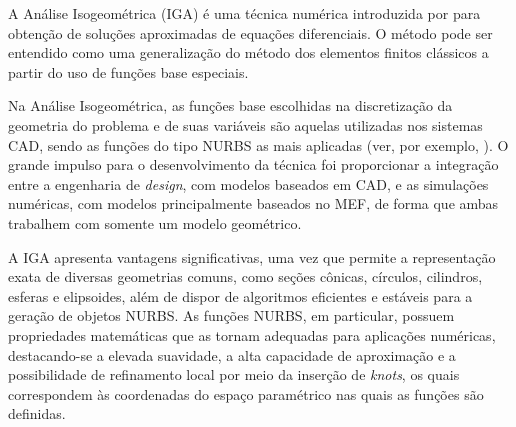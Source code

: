 \documentclass[tese_patricia]{subfiles}
\begin{document}


A Análise Isogeométrica (IGA) é uma técnica numérica introduzida por  para obtenção de soluções aproximadas de equações diferenciais. O método pode ser entendido como uma generalização do método dos elementos finitos clássicos a partir do uso de funções base especiais. 

Na Análise Isogeométrica, as funções base escolhidas na discretização da geometria do problema e de suas variáveis são aquelas utilizadas nos sistemas CAD, sendo as funções do tipo NURBS as mais aplicadas (ver, por exemplo, ). O grande impulso para o desenvolvimento da técnica foi proporcionar a integração entre a engenharia de \textit{design}, com modelos baseados em CAD, e as simulações numéricas, com modelos principalmente baseados no MEF, de forma que ambas trabalhem com somente um modelo geométrico.

A IGA apresenta vantagens significativas, uma vez que permite a representação exata de diversas geometrias comuns, como seções cônicas, círculos, cilindros, esferas e elipsoides, além de dispor de algoritmos eficientes e estáveis para a geração de objetos NURBS. As funções NURBS, em particular, possuem propriedades matemáticas que as tornam adequadas para aplicações numéricas, destacando-se a elevada suavidade, a alta capacidade de aproximação e a possibilidade de refinamento local por meio da inserção de \textit{knots}, os quais correspondem às coordenadas do espaço paramétrico nas quais as funções são definidas.
\end{document}

